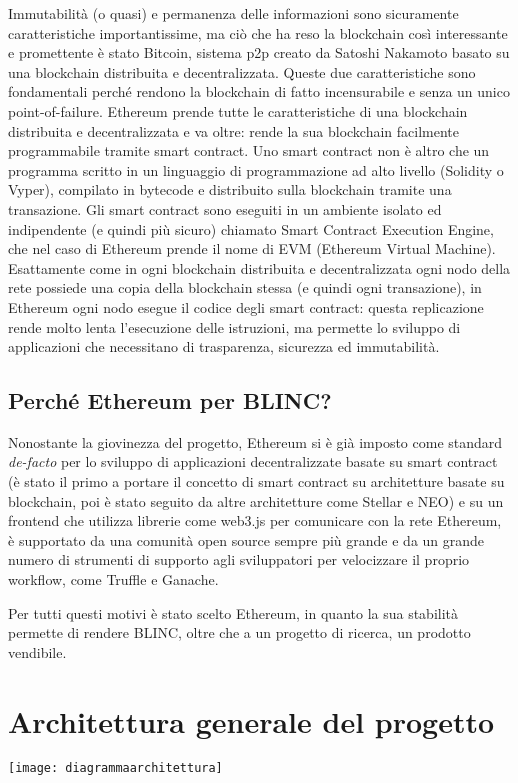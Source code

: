 Immutabilità (o quasi) e permanenza delle informazioni sono sicuramente caratteristiche 
importantissime, ma ciò che ha reso la blockchain così interessante e promettente è stato Bitcoin,
sistema p2p creato da Satoshi Nakamoto basato su una blockchain distribuita e decentralizzata. 
Queste due caratteristiche sono fondamentali perché rendono la blockchain di fatto incensurabile
e senza un unico point-of-failure.
Ethereum prende tutte le caratteristiche di una blockchain distribuita e decentralizzata
e va oltre: rende la sua blockchain facilmente programmabile tramite smart contract.
Uno smart contract non è altro che un programma scritto in un linguaggio di programmazione ad alto
livello (Solidity o Vyper), compilato in bytecode e distribuito sulla blockchain tramite
una transazione. 
Gli smart contract sono eseguiti in un ambiente isolato ed indipendente (e quindi più sicuro)
chiamato Smart Contract Execution Engine, che nel caso di Ethereum prende il nome di EVM (Ethereum Virtual Machine).
Esattamente come in ogni blockchain distribuita e decentralizzata ogni nodo della rete possiede una copia della blockchain stessa (e quindi ogni transazione), in Ethereum ogni nodo esegue il codice degli smart contract: questa replicazione rende molto lenta l’esecuzione delle istruzioni, ma permette lo sviluppo di applicazioni che necessitano di trasparenza, sicurezza ed immutabilità.

\subsection{Perché Ethereum per BLINC?}
Nonostante la giovinezza del progetto, Ethereum si è già imposto come standard \emph{de-facto}
per lo sviluppo di applicazioni decentralizzate basate su smart contract
(è stato il primo a portare il concetto di smart contract su architetture
basate su blockchain, poi è stato seguito da altre architetture come Stellar e NEO)
e su un frontend che utilizza librerie come web3.js per comunicare con la rete Ethereum,
è supportato da una comunità open source sempre più grande e da un grande numero
di strumenti di supporto agli sviluppatori per velocizzare il proprio workflow,
 come Truffle e Ganache. 

Per tutti questi motivi è stato scelto Ethereum, in quanto la sua stabilità permette di rendere BLINC, oltre che a un progetto di ricerca, un prodotto vendibile.

\section{Architettura generale del progetto}
\texttt{[image: diagrammaarchitettura]}

